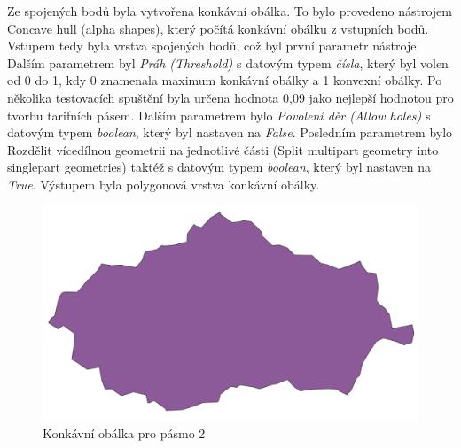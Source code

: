 Ze spojených bodů byla vytvořena konkávní obálka. To bylo provedeno nástrojem Concave hull (alpha shapes),
který počítá konkávní obálku z vstupních bodů. Vstupem tedy byla vrstva spojených bodů, což byl první parametr
nástroje. Dalším parametrem byl \textit{Práh (Threshold)} s datovým typem \textit{čísla}, který byl volen od 0 do 1,
kdy 0 znamenala maximum konkávní obálky a 1 konvexní obálky. Po několika testovacích spuštění byla 
určena hodnota 0,09 jako nejlepší hodnotou pro tvorbu tarifních pásem. Dalším parametrem bylo \textit{Povolení děr (Allow holes)} 
s datovým typem \textit{boolean}, který byl nastaven na \textit{False}.
Posledním parametrem bylo Rozdělit vícedílnou geometrii na jednotlivé části (Split multipart geometry 
into singlepart geometries) taktéž s datovým typem \textit{boolean}, který byl nastaven na \textit{True}.  
Výstupem byla polygonová vrstva konkávní obálky. 

\begin{figure}[H] \centering
    \includegraphics[width=400pt]{./pictures/concaveHull.png}
    \caption[Konkávní obálka pro pásmo 2]{Konkávní obálka pro pásmo 2}
	\label{fig:concaveHull}              
\end{figure} 

